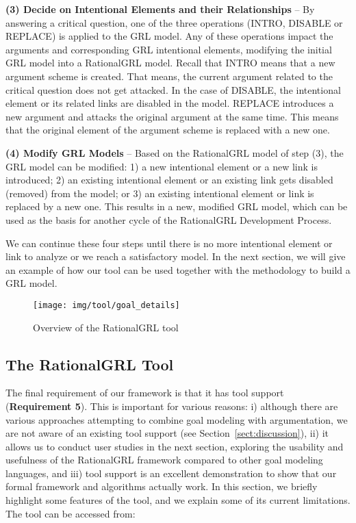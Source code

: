 \textbf{(3) Decide on Intentional Elements and their Relationships} -- By answering a critical question, one of the three operations (\textsf{INTRO}, \textsf{DISABLE} or \textsf{REPLACE}) is applied to the GRL model. Any of these operations impact the arguments and corresponding GRL intentional elements, modifying the initial GRL model into a RationalGRL model. Recall that \textsf{INTRO} means that 
a new argument scheme is created. That means, the current argument related to the critical question does not get attacked.  In the case of \textsf{DISABLE}, the intentional element or its related links are disabled in the model. \textsf{REPLACE} introduces a new argument and attacks the original argument at the same time. This means that the original element of the argument scheme is replaced with a new one.   

\textbf{(4) Modify GRL Models} -- Based on the RationalGRL model of step (3), the GRL model can be modified: 1) a new intentional element or a new link is introduced; 2) an existing intentional element or an existing link gets disabled (removed) from the model; or 3) an existing intentional element or link is replaced by a new one. This results in a new, modified GRL model, which can be used as the basis for another cycle of the RationalGRL Development Process. 

We can continue these four steps until there is no more intentional element or link to analyze or we reach a satisfactory model. In the next section, we will give an example of how our tool can be used together with the methodology to build a GRL model.  

\begin{figure*}[t]
\centering
\texttt{[image: img/tool/goal\_details]}
\caption{Overview of the RationalGRL tool}
\label{fig:tool:overview}
\end{figure*}


\subsection{The RationalGRL Tool}
\label{sect:tool}

The final requirement of our framework is that it has tool support (\textbf{Requirement 5}). This is important for various reasons: i) although there are various approaches attempting to combine goal modeling with argumentation, we are not aware of an existing tool support (see Section~\ref{sect:discussion}), ii) it allows us to conduct user studies in the next section, exploring the usability and usefulness of the RationalGRL framework compared to other goal modeling languages, and iii) tool support is an excellent demonstration to show that our formal framework and algorithms actually work. In this section, we briefly highlight some features of the tool, and we explain some of its current limitations. The tool can be accessed from:

